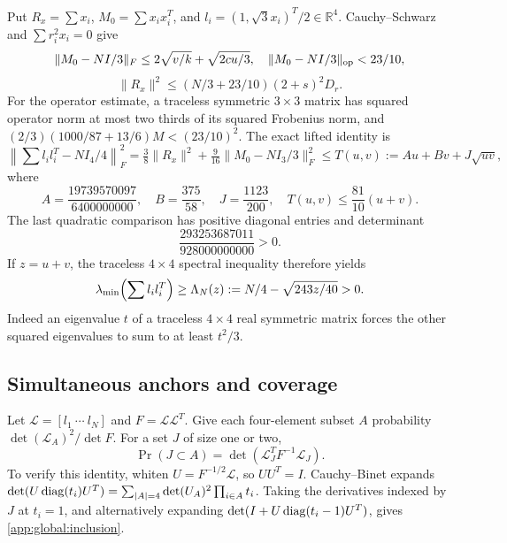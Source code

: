 Put $R_x=\sum x_i$, $M_0=\sum x_ix_i^T$, and
$l_i=(1,\sqrt3x_i)^T/2\in\mathbb R^4$. Cauchy--Schwarz and
$\sum r_i^2x_i=0$ give
\[
 \|M_0-NI/3\|_F\le2\sqrt{v/k}+\sqrt{2cu/3},\quad
 \|M_0-NI/3\|_{\rm op}<23/10,
\]
\[
 \|R_x\|^2\le(N/3+23/10)(2+s)^2D_r.
\]
For the operator estimate, a traceless symmetric $3\times3$ matrix
has squared operator norm at most two thirds of its squared Frobenius
norm, and
$(2/3)(1000/87+13/6)M<(23/10)^2$. The exact lifted identity is
\[
 \left\|\sum l_il_i^T-NI_4/4\right\|_F^2
 =\tfrac38\|R_x\|^2+\tfrac9{16}\|M_0-NI_3/3\|_F^2
 \le T(u,v):=Au+Bv+J\sqrt{uv},
\]
where
\begin{equation}\label{app:global:moment}
 A=\frac{19739570097}{6400000000},\quad B=\frac{375}{58},
 \quad J=\frac{1123}{200},\quad T(u,v)\le\frac{81}{10}(u+v).
\end{equation}
The last quadratic comparison has positive diagonal entries and determinant
\[
 \frac{293253687011}{928000000000}>0.
\]
If $z=u+v$, the traceless
$4\times4$ spectral inequality therefore yields
\begin{equation}\label{app:global:spectral}
 \lambda_{\min}\Bigl(\sum l_il_i^T\Bigr)
 \ge\Lambda_N(z):=N/4-\sqrt{243z/40}>0.
\end{equation}
Indeed an eigenvalue $t$ of a traceless $4\times4$ real symmetric matrix
forces the other squared eigenvalues to sum to at least $t^2/3$.

\subsection{Simultaneous anchors and coverage}
Let $\mathcal L=[l_1\ \cdots\ l_N]$ and $F=\mathcal L\mathcal L^T$.
Give each four-element subset $A$ probability
$\det(\mathcal L_A)^2/\det F$. For a set $J$ of size one or two,
\begin{equation}\label{app:global:inclusion}
 \Pr(J\subset A)=\det(\mathcal L_J^TF^{-1}\mathcal L_J).
\end{equation}
To verify this identity, whiten $U=F^{-1/2}\mathcal L$, so $UU^T=I$.
Cauchy--Binet expands
$\det(U\operatorname{diag}(t_i)U^T)=\sum_{|A|=4}\det(U_A)^2\prod_{i\in A}t_i$.
Taking the derivatives indexed by $J$ at $t_i=1$, and alternatively
expanding $\det(I+U\operatorname{diag}(t_i-1)U^T)$, gives
\eqref{app:global:inclusion}.


